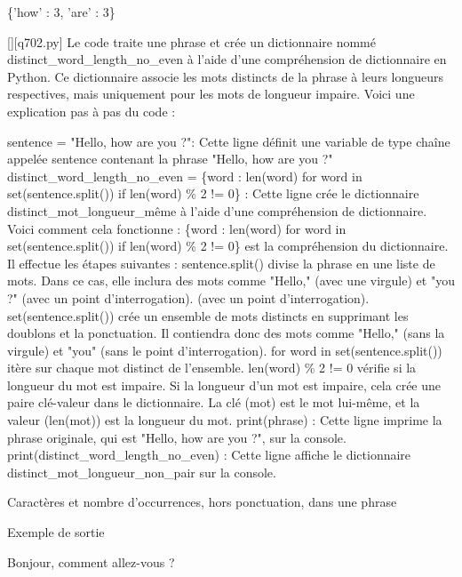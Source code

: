 \{'how' : 3, 'are' : 3\}
        \par
        \begin{solution}
            \renewcommand{\nomfichier}{q702.py}
            \pythonfile{\chemincode \nomfichier}[][\nomfichier]
            Le code traite une phrase et crée un dictionnaire nommé distinct\_word\_length\_no\_even à l'aide d'une compréhension de dictionnaire en Python. Ce dictionnaire associe les mots distincts de la phrase à leurs longueurs respectives, mais uniquement pour les mots de longueur impaire. Voici une explication pas à pas du code :

    sentence = "Hello, how are you ?": Cette ligne définit une variable de type chaîne appelée sentence contenant la phrase "Hello, how are you ?"
    distinct\_word\_length\_no\_even = \{word : len(word) for word in set(sentence.split()) if len(word) \% 2 != 0\} : Cette ligne crée le dictionnaire distinct\_mot\_longueur\_même à l'aide d'une compréhension de dictionnaire. Voici comment cela fonctionne :
        \{word : len(word) for word in set(sentence.split()) if len(word) \% 2 != 0\} est la compréhension du dictionnaire. Il effectue les étapes suivantes :
        sentence.split() divise la phrase en une liste de mots. Dans ce cas, elle inclura des mots comme "Hello," (avec une virgule) et "you ?" (avec un point d'interrogation). (avec un point d'interrogation).
        set(sentence.split()) crée un ensemble de mots distincts en supprimant les doublons et la ponctuation. Il contiendra donc des mots comme "Hello," (sans la virgule) et "you" (sans le point d'interrogation).
        for word in set(sentence.split()) itère sur chaque mot distinct de l'ensemble.
        len(word) \% 2 != 0 vérifie si la longueur du mot est impaire.
        Si la longueur d'un mot est impaire, cela crée une paire clé-valeur dans le dictionnaire. La clé (mot) est le mot lui-même, et la valeur (len(mot)) est la longueur du mot.
    print(phrase) : Cette ligne imprime la phrase originale, qui est "Hello, how are you ?", sur la console.
    print(distinct\_word\_length\_no\_even) : Cette ligne affiche le dictionnaire distinct\_mot\_longueur\_non\_pair sur la console.
        \end{solution}
        

        \question
        Caractères et nombre d'occurrences, hors ponctuation, dans une phrase

Exemple de sortie

Bonjour, comment allez-vous ?

